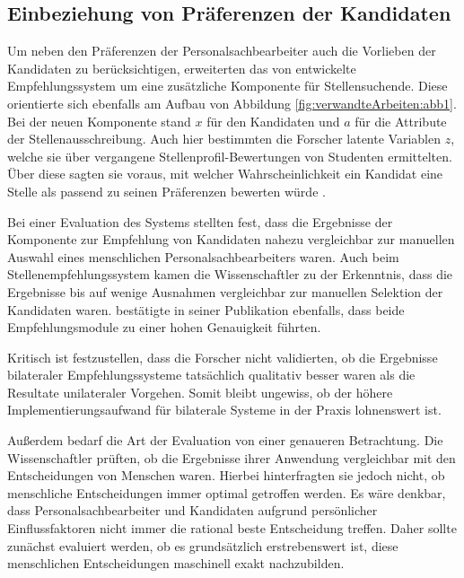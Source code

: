 \subsection{Einbeziehung von Präferenzen der Kandidaten}
\label{ch:verwandteArbeiten:aufDemPEFitBasierendeBilateraleSysteme:einbeziehungKandidaten}
Um neben den Präferenzen der Personalsachbearbeiter auch die Vorlieben der Kandidaten zu berücksichtigen, erweiterten \textcite[S. 4f.]{malinowski:2006} das von \textcite[S. 4ff.]{faerber:2003} entwickelte Empfehlungssystem um eine zusätzliche Komponente für Stellensuchende. Diese orientierte sich ebenfalls am Aufbau von Abbildung \ref{fig:verwandteArbeiten:abb1}. Bei der neuen Komponente stand $x$ für den Kandidaten und $a$ für die Attribute der Stellenausschreibung. Auch hier bestimmten die Forscher latente Variablen $z$, welche sie über vergangene Stellenprofil-Bewertungen von Studenten ermittelten. Über diese sagten sie voraus, mit welcher Wahrscheinlichkeit ein Kandidat eine Stelle als passend zu seinen Präferenzen bewerten würde \cite[S. 4f.]{malinowski:2006}.

Bei einer Evaluation des Systems stellten \textcite[S. 6f.]{malinowski:2006} fest, dass die Ergebnisse der Komponente zur Empfehlung von Kandidaten nahezu vergleichbar zur manuellen Auswahl eines menschlichen Personalsachbearbeiters waren. Auch beim Stellenempfehlungssystem kamen die Wissenschaftler zu der Erkenntnis, dass die Ergebnisse bis auf wenige Ausnahmen vergleichbar zur manuellen Selektion der Kandidaten waren. \textcite[S. 7]{keim:2007} bestätigte in seiner Publikation ebenfalls, dass beide Empfehlungsmodule zu einer hohen Genauigkeit führten.

Kritisch ist festzustellen, dass die Forscher nicht validierten, ob die Ergebnisse bilateraler Empfehlungssysteme tatsächlich qualitativ besser waren als die Resultate unilateraler Vorgehen. Somit bleibt ungewiss, ob der höhere Implementierungsaufwand für bilaterale Systeme in der Praxis lohnenswert ist.

Außerdem bedarf die Art der Evaluation von \textcite[S. 6f.]{malinowski:2006} einer genaueren Betrachtung. Die Wissenschaftler prüften, ob die Ergebnisse ihrer Anwendung vergleichbar mit den Entscheidungen von Menschen waren. Hierbei hinterfragten sie jedoch nicht, ob menschliche Entscheidungen immer optimal getroffen werden. Es wäre denkbar, dass Personalsachbearbeiter und Kandidaten aufgrund persönlicher Einflussfaktoren nicht immer die rational beste Entscheidung treffen. Daher sollte zunächst evaluiert werden, ob es grundsätzlich erstrebenswert ist, diese menschlichen Entscheidungen maschinell exakt nachzubilden.

